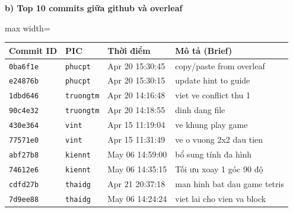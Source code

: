 \documentclass[12pt,a4paper]{article}
\begin{document}
\textbf{b) Top 10 commits giữa github và overleaf}
\begin{table}[H]
\centering
\renewcommand{\arraystretch}{1.2}
\begin{adjustbox}{max width=\textwidth}
\begin{tabular}{|l|l|l|p{6.5cm}|}
\hline
\rowcolor{gray!10}
\textbf{Commit ID} & \textbf{PIC} & \textbf{Thời điểm} & \textbf{Mô tả (Brief)} \\ \hline
\texttt{0ba6f1e} & \texttt{phucpt} & Apr 20 15:30:45 & copy/paste from overleaf \\ \hline
\texttt{e24876b} & \texttt{phucpt} & Apr 20 15:30:15 & update hint to guide \\ \hline
\texttt{1dbd646} & \texttt{truongtm} & Apr 20 14:16:48 & viet ve conflict thu 1 \\ \hline
\texttt{90c4e32} & \texttt{truongtm} & Apr 20 14:18:55 & dinh dang file \\ \hline
\texttt{430e364} & \texttt{vint} & Apr 15 11:19:04 & ve khung play game \\ \hline
\texttt{77571e0} & \texttt{vint} & Apr 15 11:31:49 & ve o vuong 2x2 dau tien \\ \hline
\texttt{abf27b8} & \texttt{kiennt} & May 06 14:59:00 & bổ sung tính đa hình \\ \hline
\texttt{74612e6} & \texttt{kiennt} & May 06 14:35:15 & Tối ưu xoay 1 góc 90 độ \\ \hline
\texttt{cdfd27b} & \texttt{thaidg} & Apr 21 20:37:18 & man hinh bat dau game tetris \\ \hline
\texttt{7d9ee88} & \texttt{thaidg} & May 06 14:24:24 & viet lai cho vien va block \\ \hline
\end{tabular}
\end{adjustbox}
\end{table}

\end{document}
